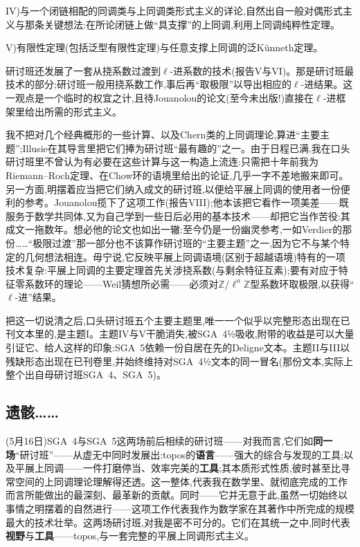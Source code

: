 IV)与一个闭链相配的同调类与上同调类形式主义的详论,自然出自一般对偶形式主义与那条关键想法:在所论闭链上做“具支撑”的上同调,利用上同调纯粹性定理。

V)有限性定理(包括泛型有限性定理)与任意支撑上同调的泛Künneth定理。

研讨班还发展了一套从挠系数过渡到$\ell$-进系数的技术(报告V与VI)。那是研讨班最技术的部分;研讨班一般用挠系数工作,事后再“取极限”以导出相应的$\ell$-进结果。这一观点是一个临时的\dmark{}权宜之计,且待Jouanolou的论文(至今未出版!)直接在$\ell$-进框架里给出所需的形式主义。

我不把对几个经典概形的一些计算、以及Chern类的上同调理论,算进“主要主题”;Illusie在其导言里把它们捧为研讨班“最有趣的”之一。由于日程已满,我在口头研讨班里不曾认为有必要在这些计算与这一构造上流连:只需把十年前我为Riemann--Roch定理、在Chow环的语境里给出的论证,几乎一字不差地搬来即可。另一方面,明摆着应当把它们纳入成文的研讨班,以便给平展上同调的使用者一份便利的参考。Jouanolou揽下了这项工作(报告VIII);他本该把它看作一项美差——既服务于数学共同体,又为自己学到一些日后必用的基本技术——却把它当作苦役:其成文一拖数年。想必他的论文也如出一辙:至今仍是一份幽灵参考,一如Verdier的那份……“极限过渡”那一部分也不该算作研讨班的“主要主题”之一,因为它不与某个特定的几何想法相连。毋宁说,它反映平展上同调语境(区别于超越语境)特有的一项技术复杂:平展上同调的主要定理首先关涉挠系数(与剩余特征互素);要有对应于特征零系数环的理论——Weil猜想所必需——必须对$\mathbb{Z}/\ell^n\mathbb{Z}$型系数环取极限,以获得“$\ell$-进”结果。

把这一切说清之后,口头研讨班五个主要主题里,唯一一个似乎以完整形态出现在已刊文本里的,是主题I。主题IV与V干脆消失,被SGA~4½吸收,附带的收益是可以大量引证它、给人这样的印象:SGA~5依赖一份自居在先的Deligne文本。主题II与III以残缺形态出现在已刊卷里,并始终维持对SGA~4½文本的同一冒名(那份文本,实际上整个出自母研讨班SGA~4、SGA~5)。

\subsection{遗骸……}


\dmark{}(5月16日)SGA~4与SGA~5这两场前后相续的研讨班——对我而言,它们如\textbf{同一场}“研讨班”——从虚无中同时发展出:topos的\textbf{语言}——强大的综合与发现的工具;以及平展上同调——一件打磨停当、效率完美的\textbf{工具};其本质形式性质,彼时甚至比寻常空间的上同调理论理解得还透。这一整体,代表我在数学里、就彻底完成的工作而言所能做出的最深刻、最革新的贡献。同时——它并无意于此,虽然一切始终以事情之明摆着的自然进行——这项工作代表我作为数学家在其著作中所完成的规模最大的技术壮举。这两场研讨班,对我是密不可分的。它们在其统一之中,同时代表\textbf{视野}与\textbf{工具}——topos,与一套完整的平展上同调形式主义。


